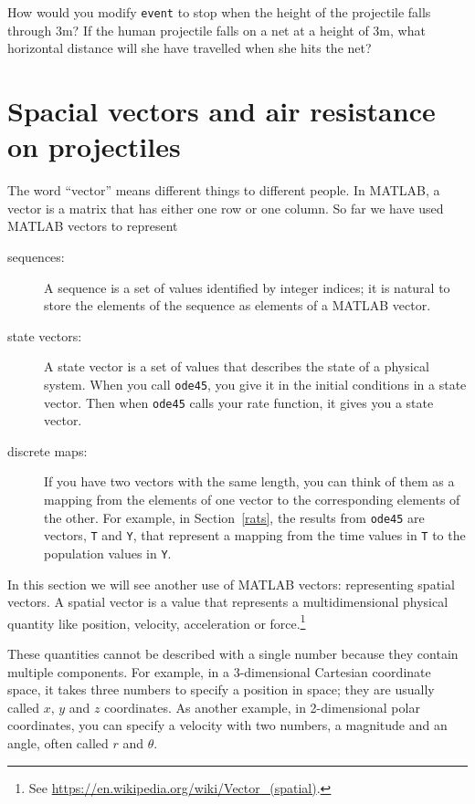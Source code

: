\documentclass{book}
\begin{document}
\begin{ex}
How would you modify {\tt event} to stop when the height of
the projectile falls through 3m?
If the human projectile falls on a net at a height of 3m, what
horizontal distance will she have travelled when she hits the
net?
\end{ex}


\section{Spacial vectors and air resistance on projectiles}
\label{spacial}

The word ``vector'' means different things to different people.
In MATLAB, a vector is a matrix that has either one row or one
column.  So far we have used MATLAB vectors to represent

\begin{description}

\item[sequences:] A sequence is a set of values identified by
integer indices; it is natural to store the elements of the
sequence as elements of a MATLAB vector.

\item[state vectors:] A state vector is a set of values that
describes the state of a physical system.  When you call
{\tt ode45}, you give it in the initial conditions in a state
vector.  Then when {\tt ode45} calls your rate function, it
gives you a state vector.

\item[discrete maps:] If you have two vectors with the same
length, you can think of them as a mapping from the elements
of one vector to the corresponding elements of the other.  For
example, in Section~\ref{rats}, the results from {\tt ode45}
are vectors, {\tt T} and {\tt Y}, that represent a mapping
from the time values in {\tt T} to the population values in {\tt Y}.

\end{description}

In this section we will see another use of MATLAB vectors:
representing spatial vectors.  A spatial vector is a value that
represents a multidimensional physical quantity like position,
velocity, acceleration or force.\footnote{See
\url{https://en.wikipedia.org/wiki/Vector_(spatial)}.}

These quantities cannot be described with a
single number because they contain multiple components.  For example,
in a 3-dimensional Cartesian coordinate space, it takes three numbers
to specify a position in space; they are usually called $x$, $y$ and
$z$ coordinates.  As another example, in 2-dimensional polar
coordinates, you can specify a velocity with two numbers, a
magnitude and an angle, often called $r$ and $\theta$.
\end{document}
